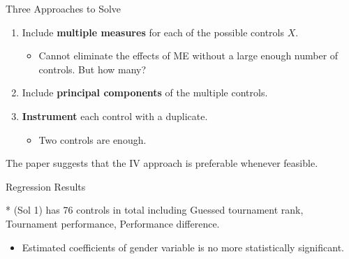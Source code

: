 \begin{frame}{Three Approaches to Solve}
    \begin{enumerate}
        \item Include \textbf{multiple measures} for each of the possible controls $X$.
        \begin{itemize}
            \item Cannot eliminate the effects of ME without a large enough number of controls. But how many?
        \end{itemize}
        \item Include \textbf{principal components} of the multiple controls.
        \item \textbf{Instrument} each control with a duplicate.
        \begin{itemize}
            \item Two controls are enough.
        \end{itemize}
    \end{enumerate}
    \vspace{3mm}
    The paper suggests that the {\color{blue}IV approach} is preferable whenever feasible.
\end{frame}

\begin{frame}{Regression Results}
\begin{table}[]
\centering
\label{tab:gender2}
\end{table}
\small{\color{blue}* (Sol 1) has 76 controls in total including Guessed tournament rank, Tournament performance, Performance difference.}
\begin{itemize}
    \item[$\implies$] Estimated coefficients of gender variable is no more statistically significant.
\end{itemize}
\end{frame}

